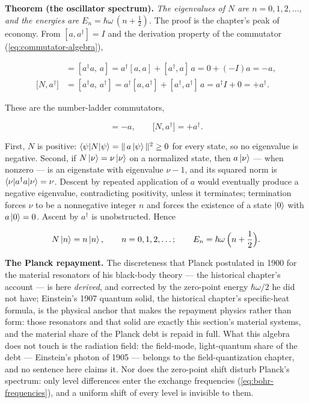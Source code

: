 \textbf{Theorem (the oscillator spectrum).} \emph{The eigenvalues of $N$ are $n = 0, 1, 2, \ldots$, and the energies are $E_n = \hbar\omega\,(n + \tfrac12)$.} The proof is the chapter's peak of economy. From $[a,a^\dagger]=I$ and the derivation property of the commutator (\eqref{eq:commutator-algebra}),
\begin{linenomath}
    \begin{align*}
        [N,a] &= [a^\dagger a,\,a] = a^\dagger[a,a] + [a^\dagger,a]\,a = 0 + (-I)a = -a,\\
        \bigl[N,a^\dagger\bigr] &= [a^\dagger a,\,a^\dagger] = a^\dagger[a,a^\dagger] + [a^\dagger,a^\dagger]\,a = a^\dagger I + 0 = +a^\dagger.
    \end{align*}
\end{linenomath}
These are the number-ladder commutators,
\begin{linenomath}
    \begin{equation}
        [N,a] = -a,
        \qquad
        \bigl[N,a^\dagger\bigr] = +a^\dagger.
        \label{eq:number-ladder-commutators}
    \end{equation}
\end{linenomath}
First, $N$ is positive: $\braket{\psi|N|\psi} = \|\,a\ket{\psi}\|^2 \geq 0$ for every state, so no eigenvalue is negative. Second, if $N\ket{\nu} = \nu\ket{\nu}$ on a normalized state, then $a\ket{\nu}$ --- when nonzero --- is an eigenstate with eigenvalue $\nu - 1$, and its squared norm is $\braket{\nu|a^\dagger a|\nu} = \nu$. Descent by repeated application of $a$ would eventually produce a negative eigenvalue, contradicting positivity, unless it terminates; termination forces $\nu$ to be a nonnegative integer $n$ and forces the existence of a state $\ket{0}$ with $a\ket{0} = 0$. Ascent by $a^\dagger$ is unobstructed. Hence
\begin{linenomath}
    \begin{equation}
        N\ket{n} = n\ket{n},
        \qquad n = 0, 1, 2, \ldots;
        \qquad
        E_n = \hbar\omega\,\Bigl(n + \frac{1}{2}\Bigr).
        \label{eq:number-spectrum}
    \end{equation}
\end{linenomath}

\textbf{The Planck repayment.} The discreteness that Planck postulated in 1900 for the material resonators of his black-body theory --- the historical chapter's account --- is here \emph{derived}, and corrected by the zero-point energy $\hbar\omega/2$ he did not have; Einstein's 1907 quantum solid, the historical chapter's specific-heat formula, is the physical anchor that makes the repayment physics rather than form: those resonators and that solid are exactly this section's material systems, and the material share of the Planck debt is repaid in full. What this algebra does not touch is the radiation field: the field-mode, light-quantum share of the debt --- Einstein's photon of 1905 --- belongs to the field-quantization chapter, and no sentence here claims it. Nor does the zero-point shift disturb Planck's spectrum: only level differences enter the exchange frequencies (\eqref{eq:bohr-frequencies}), and a uniform shift of every level is invisible to them.

